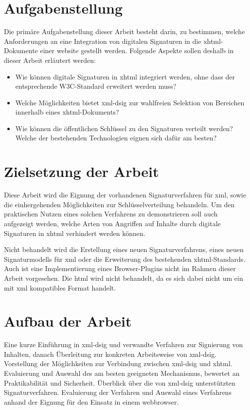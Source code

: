 \section{Aufgabenstellung}
\label{sec:Einleitung:aufgabenstellung}
Die primäre Aufgabenstellung dieser Arbeit besteht darin, zu bestimmen, welche Anforderungen an eine Integration von digitalen Signaturen in die
\gls{xhtml}-Dokumente einer \gls{website} gestellt werden. Folgende Aspekte sollen deshalb in dieser Arbeit erläutert werden:
\begin{itemize}
    \item Wie können digitale Signaturen in \gls{xhtml} integriert werden, ohne dass der entsprechende W3C-Standard \cite{xhtml:w3c} erweitert werden muss?
    \item Welche Möglichkeiten bietet \gls{xml-dsig} zur wahlfreien Selektion von Bereichen innerhalb eines \gls{xhtml}-Dokuments?
    \item Wie können die öffentlichen Schlüssel zu den Signaturen verteilt werden? Welche der bestehenden Technologien eignen sich dafür am besten?
\end{itemize}

\section{Zielsetzung der Arbeit}
\label{sec:Einleitung:ziele}
Diese Arbeit wird die Eignung der vorhandenen Signaturverfahren für \gls{xml}, sowie die einhergehenden Möglichkeiten zur Schlüsselverteilung
behandeln. Um den praktischen Nutzen eines solchen Verfahrens zu demonstrieren soll auch aufgezeigt werden, welche Arten von Angriffen auf Inhalte durch
digitale Signaturen in \gls{xhtml} verhindert werden können.

Nicht behandelt wird die Erstellung eines neuen Signaturverfahrens, eines neuen Signaturmodells für \gls{xml} oder die Erweiterung des bestehenden
\gls{xhtml}-Standards. Auch ist eine Implementierung eines Browser-Plugins nicht im Rahmen dieser Arbeit vorgesehen. Die \gls{html} wird nicht behandelt, da es
sich dabei nicht um ein mit \gls{xml} kompatibles Format handelt.


\section{Aufbau der Arbeit}
\label{sec:Einleitung:aufbau}
Eine kurze Einführung in \gls{xml-dsig} und verwandte Verfahren zur Signierung von Inhalten, danach Überleitung zur konkreten Arbeitsweise von \gls{xml-dsig}.
Vorstellung der Möglichkeiten zur Verbindung zwischen \gls{xml-dsig} und \gls{xhtml}. Evaluierung und Auswahl des am besten geeigneten Mechanismus, bewertet an
Praktikabilität und Sicherheit. Überblick über die von \gls{xml-dsig} unterstützten Signaturverfahren. Evaluierung der Verfahren und Auswahl eines Verfahrens
anhand der Eignung für den Einsatz in einem \gls{webbrowser}.


